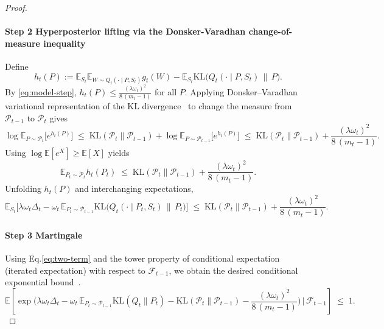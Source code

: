 \documentclass{article}
\begin{document}
\begin{proof}
\paragraph{Step 2 Hyperposterior lifting via the Donsker-Varadhan change-of-measure inequality} 
Define
\[
h_t(P):=\mathbb E_{S_t}\mathbb E_{W\sim Q_t(\cdot\mid P,S_t)} g_t(W)
-\mathbb E_{S_t}\mathrm{KL}\!\big(Q_t(\cdot\mid P,S_t)\,\|\,P\big).
\]
By \eqref{eq:model-step}, $h_t(P)\le \frac{(\lambda\omega_t)^2}{8\,(m_t-1)}$ for all $P$.
Applying Donsker–Varadhan variational representation of the KL divergence~\cite{NEURIPS2021_54a367d6} to change the measure from $\mathcal P_{t-1}$ to $\mathcal P_t$ gives
\begin{equation}
\label{eq:dv-p}
\log\mathbb E_{P\sim\mathcal P_t}\!\big[e^{h_t(P)}\big]
\;\le\; \mathrm{KL}(\mathcal P_t\|\mathcal P_{t-1})
+\log\mathbb E_{P\sim\mathcal P_{t-1}}\!\big[e^{h_t(P)}\big]
\;\le\; \mathrm{KL}(\mathcal P_t\|\mathcal P_{t-1})
+\frac{(\lambda\omega_t)^2}{8\,(m_t-1)}.
\end{equation}
Using $\log\mathbb E[e^X]\ge \mathbb E[X]$ yields
\begin{equation}
\label{eq:p-expect}
\mathbb E_{P_t\sim\mathcal P_t} h_t(P_t)
\;\le\; \mathrm{KL}(\mathcal P_t\|\mathcal P_{t-1})
+\frac{(\lambda\omega_t)^2}{8\,(m_t-1)}.
\end{equation}
Unfolding $h_t(P)$ and interchanging expectations,
\begin{equation}
\label{eq:two-term}
\mathbb E_{S_t}\Big[
\lambda\omega_t\Delta_t
-\omega_t\,\mathbb E_{P_t\sim\mathcal P_{t-1}}\mathrm{KL}\!\big(Q_t(\cdot\mid P_t,S_t)\,\|\,P_t\big)
\Big]
\;\le\;
\mathrm{KL}(\mathcal P_t\|\mathcal P_{t-1})
+\frac{(\lambda\omega_t)^2}{8\,(m_t-1)}.
\end{equation}

\paragraph{Step 3 Martingale}







Using Eq.\eqref{eq:two-term} and the tower property of conditional expectation (iterated expectation) with respect to $\mathcal F_{t-1}$, we obtain the desired conditional exponential bound~\cite{yangshuxue}.
\begin{equation}
\label{eq:cond-mgf}
\mathbb E\!\left[
\exp\!\Big(
\lambda\omega_t\Delta_t
-\omega_t\,\mathbb E_{P_t\sim\mathcal P_{t-1}}\mathrm{KL}(Q_t\|P_t)
-\mathrm{KL}(\mathcal P_t\|\mathcal P_{t-1})
-\frac{(\lambda\omega_t)^2}{8\,(m_t-1)}
\Big)\,\Big|\,\mathcal F_{t-1}\right]\;\le\;1.
\end{equation}



\end{proof}
\end{document}
